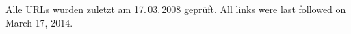 \documentclass[
               paper=a4,
               BCOR1.92mm,DIV12,headinclude, %
               titlepage,
               bibliography=totoc,
               headsepline,
               cleardoublepage=empty,
               parskip=half,
	       pointlessnumbers, %
               final   %
               ]{scrreprt}
\let\ifdeutsch\iffalse
\begin{document}
\renewcommand*{\chapterpagestyle}{scrplain}
\pagestyle{scrheadings}

%
%
%







%
%
%
%
\appendix
%
%
\ifdeutsch
\else
\fi

\ifdeutsch
Alle URLs wurden zuletzt am 17.\,03.\,2008 geprüft.
\else
All links were last followed on March 17, 2014.
\fi

\pagestyle{empty}
\renewcommand*{\chapterpagestyle}{empty}
\Versicherung
\end{document}
